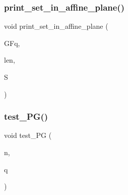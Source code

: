 \mbox{\label{projective_8_c_ae4a251f73555cac9a2f88a42eeda7d4d}} 
\subsubsection{\texorpdfstring{print\+\_\+set\+\_\+in\+\_\+affine\+\_\+plane()}{print\_set\_in\_affine\_plane()}}
{\footnotesize\ttfamily void print\+\_\+set\+\_\+in\+\_\+affine\+\_\+plane (\begin{DoxyParamCaption}\item[{\mbox{\hyperlink{classfinite__field}{finite\+\_\+field}} \&}]{G\+Fq,  }\item[{\mbox{\hyperlink{galois_8h_a09fddde158a3a20bd2dcadb609de11dc}{I\+NT}}}]{len,  }\item[{\mbox{\hyperlink{galois_8h_a09fddde158a3a20bd2dcadb609de11dc}{I\+NT}} $\ast$}]{S }\end{DoxyParamCaption})}

\mbox{\label{projective_8_c_a11bc40603c4324a9466d398a0812fe4f}} 
\subsubsection{\texorpdfstring{test\+\_\+\+P\+G()}{test\_PG()}}
{\footnotesize\ttfamily void test\+\_\+\+PG (\begin{DoxyParamCaption}\item[{\mbox{\hyperlink{galois_8h_a09fddde158a3a20bd2dcadb609de11dc}{I\+NT}}}]{n,  }\item[{\mbox{\hyperlink{galois_8h_a09fddde158a3a20bd2dcadb609de11dc}{I\+NT}}}]{q }\end{DoxyParamCaption})}

